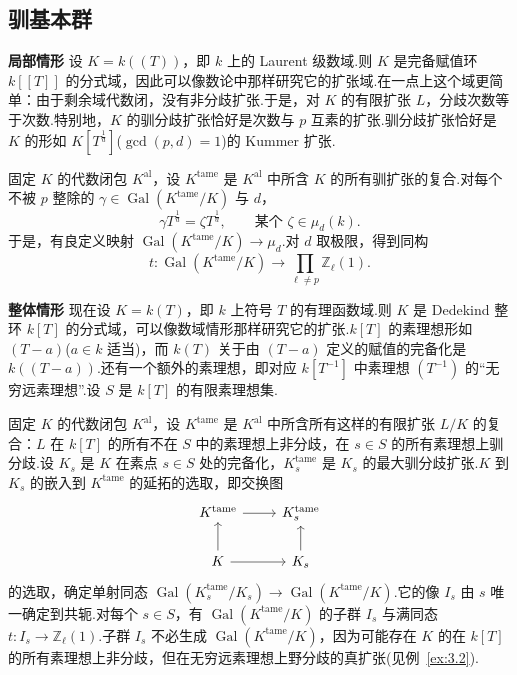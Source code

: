 \subsection*{驯基本群}

\textbf{局部情形} 设 $K = k((T))$，即 $k$ 上的 Laurent 级数域.则 $K$ 是完备赋值环 $k[[T]]$ 的分式域，因此可以像数论中那样研究它的扩张域.在一点上这个域更简单：由于剩余域代数闭，没有非分歧扩张.于是，对 $K$ 的有限扩张 $L$，分歧次数等于次数.特别地，$K$ 的驯分歧扩张恰好是次数与 $p$ 互素的扩张.驯分歧扩张恰好是 $K$ 的形如 $K[T^{\frac{1}{d}}]$($\gcd(p, d) = 1$)的 Kummer 扩张.

固定 $K$ 的代数闭包 $K^{\mathrm{al}}$，设 $K^{\mathrm{tame}}$ 是 $K^{\mathrm{al}}$ 中所含 $K$ 的所有驯扩张的复合.对每个不被 $p$ 整除的 $\gamma \in \operatorname{Gal}(K^{\mathrm{tame}}/K)$ 与 $d$，
\[
\gamma T^{\frac{1}{d}} = \zeta T^{\frac{1}{d}}, \qquad \text{某个 } \zeta \in \mu_d(k).
\]
于是，有良定义映射 $\operatorname{Gal}(K^{\mathrm{tame}}/K) \to \mu_d$.对 $d$ 取极限，得到同构
\[
t \colon \operatorname{Gal}(K^{\mathrm{tame}}/K) \to \prod_{\ell \neq p} \mathbb{Z}_{\ell}(1).
\]

\textbf{整体情形} 现在设 $K = k(T)$，即 $k$ 上符号 $T$ 的有理函数域.则 $K$ 是 Dedekind 整环 $k[T]$ 的分式域，可以像数域情形那样研究它的扩张.$k[T]$ 的素理想形如 $(T - a)$($a \in k$ 适当)，而 $k(T)$ 关于由 $(T - a)$ 定义的赋值的完备化是 $k((T - a))$.还有一个额外的素理想，即对应 $k[T^{-1}]$ 中素理想 $(T^{-1})$ 的``无穷远素理想''.设 $S$ 是 $k[T]$ 的有限素理想集.

固定 $K$ 的代数闭包 $K^{\mathrm{al}}$，设 $K^{\mathrm{tame}}$ 是 $K^{\mathrm{al}}$ 中所含所有这样的有限扩张 $L/K$ 的复合：$L$ 在 $k[T]$ 的所有不在 $S$ 中的素理想上非分歧，在 $s \in S$ 的所有素理想上驯分歧.设 $K_s$ 是 $K$ 在素点 $s \in S$ 处的完备化，$K^{\mathrm{tame}}_s$ 是 $K_s$ 的最大驯分歧扩张.$K$ 到 $K_s$ 的嵌入到 $K^{\mathrm{tame}}$ 的延拓的选取，即交换图
\[
\begin{tikzcd}
K^{\mathrm{tame}} \arrow[r] & K^{\mathrm{tame}}_s \\
K \arrow[u] \arrow[r] & K_s \arrow[u]
\end{tikzcd}
\]
的选取，确定单射同态 $\operatorname{Gal}(K^{\mathrm{tame}}_s/K_s) \to \operatorname{Gal}(K^{\mathrm{tame}}/K)$.它的像 $I_s$ 由 $s$ 唯一确定到共轭.对每个 $s \in S$，有 $\operatorname{Gal}(K^{\mathrm{tame}}/K)$ 的子群 $I_s$ 与满同态 $t \colon I_s \to \mathbb{Z}_{\ell}(1)$.子群 $I_s$ 不必生成 $\operatorname{Gal}(K^{\mathrm{tame}}/K)$，因为可能存在 $K$ 的在 $k[T]$ 的所有素理想上非分歧，但在无穷远素理想上野分歧的真扩张(见例~\ref{ex:3.2}).

